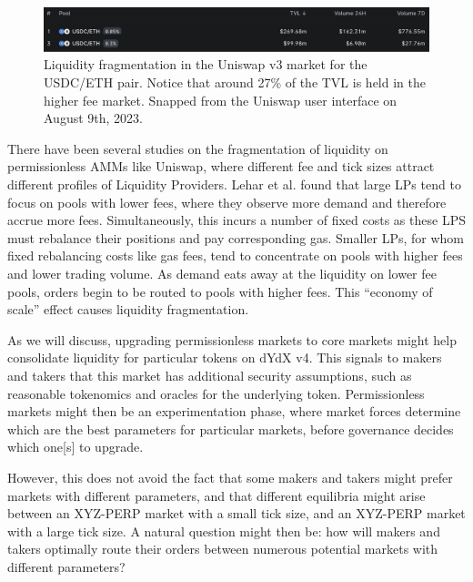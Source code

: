             \begin{figure}[htp]
                \centering
                \includegraphics[width=\linewidth]{figs/fragmentation.png}
                \captionsetup{width=\linewidth}
                \caption{Liquidity fragmentation in the Uniswap v3 market for the USDC/ETH pair. Notice that around 27\% of the TVL is held in the higher fee market. Snapped from the Uniswap user interface on August 9th, 2023.}
                \label{fig:fragmentation}
            \end{figure}

            There have been several studies on the fragmentation of liquidity on permissionless AMMs like Uniswap, where different fee and tick sizes attract different profiles of Liquidity Providers. Lehar et al. \cite{lehar2023liquidity} found that large LPs tend to focus on pools with lower fees, where they observe more demand and therefore accrue more fees. Simultaneously, this incurs a number of fixed costs as these LPS must rebalance their positions and pay corresponding gas. Smaller LPs, for whom fixed rebalancing costs like gas fees, tend to concentrate on pools with higher fees and lower trading volume. As demand eats away at the liquidity on lower fee pools, orders begin to be routed to pools with higher fees. This ``economy of scale'' effect causes liquidity fragmentation.

            As we will discuss, upgrading permissionless markets to core markets might help consolidate liquidity for particular tokens on dYdX v4. This signals to makers and takers that this market has additional security assumptions, such as reasonable tokenomics and oracles for the underlying token. Permissionless markets might then be an experimentation phase, where market forces determine which are the best parameters for particular markets, before governance decides which one[s] to upgrade.
            
            However, this does not avoid the fact that some makers and takers might prefer markets with different parameters, and that different equilibria might arise between an XYZ-PERP market with a small tick size, and an XYZ-PERP market with a large tick size. A natural question might then be: how will makers and takers optimally route their orders between numerous potential markets with different parameters?

